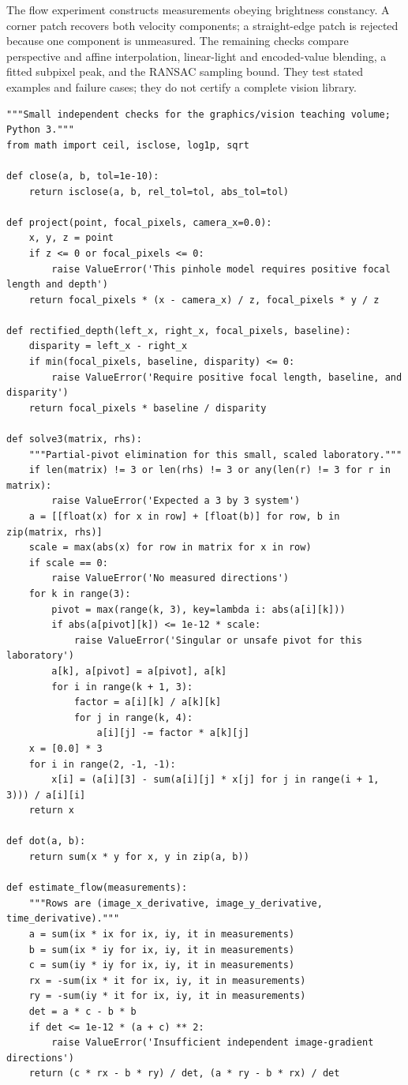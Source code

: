 The flow experiment constructs measurements obeying brightness constancy. A corner patch recovers both velocity components; a straight-edge patch is rejected because one component is unmeasured. The remaining checks compare perspective and affine interpolation, linear-light and encoded-value blending, a fitted subpixel peak, and the RANSAC sampling bound. They test stated examples and failure cases; they do not certify a complete vision library.

\begin{verbatim}
"""Small independent checks for the graphics/vision teaching volume; Python 3."""
from math import ceil, isclose, log1p, sqrt

def close(a, b, tol=1e-10):
    return isclose(a, b, rel_tol=tol, abs_tol=tol)

def project(point, focal_pixels, camera_x=0.0):
    x, y, z = point
    if z <= 0 or focal_pixels <= 0:
        raise ValueError('This pinhole model requires positive focal length and depth')
    return focal_pixels * (x - camera_x) / z, focal_pixels * y / z

def rectified_depth(left_x, right_x, focal_pixels, baseline):
    disparity = left_x - right_x
    if min(focal_pixels, baseline, disparity) <= 0:
        raise ValueError('Require positive focal length, baseline, and disparity')
    return focal_pixels * baseline / disparity

def solve3(matrix, rhs):
    """Partial-pivot elimination for this small, scaled laboratory."""
    if len(matrix) != 3 or len(rhs) != 3 or any(len(r) != 3 for r in matrix):
        raise ValueError('Expected a 3 by 3 system')
    a = [[float(x) for x in row] + [float(b)] for row, b in zip(matrix, rhs)]
    scale = max(abs(x) for row in matrix for x in row)
    if scale == 0:
        raise ValueError('No measured directions')
    for k in range(3):
        pivot = max(range(k, 3), key=lambda i: abs(a[i][k]))
        if abs(a[pivot][k]) <= 1e-12 * scale:
            raise ValueError('Singular or unsafe pivot for this laboratory')
        a[k], a[pivot] = a[pivot], a[k]
        for i in range(k + 1, 3):
            factor = a[i][k] / a[k][k]
            for j in range(k, 4):
                a[i][j] -= factor * a[k][j]
    x = [0.0] * 3
    for i in range(2, -1, -1):
        x[i] = (a[i][3] - sum(a[i][j] * x[j] for j in range(i + 1, 3))) / a[i][i]
    return x

def dot(a, b):
    return sum(x * y for x, y in zip(a, b))

def estimate_flow(measurements):
    """Rows are (image_x_derivative, image_y_derivative, time_derivative)."""
    a = sum(ix * ix for ix, iy, it in measurements)
    b = sum(ix * iy for ix, iy, it in measurements)
    c = sum(iy * iy for ix, iy, it in measurements)
    rx = -sum(ix * it for ix, iy, it in measurements)
    ry = -sum(iy * it for ix, iy, it in measurements)
    det = a * c - b * b
    if det <= 1e-12 * (a + c) ** 2:
        raise ValueError('Insufficient independent image-gradient directions')
    return (c * rx - b * ry) / det, (a * ry - b * rx) / det


\end{verbatim}
